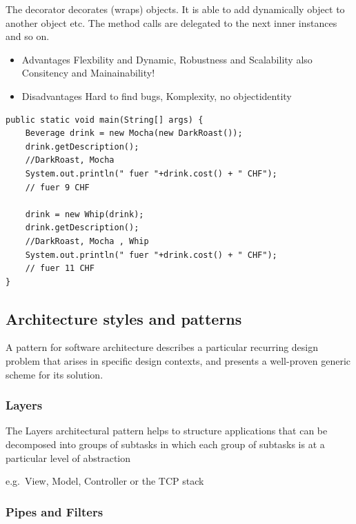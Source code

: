The decorator decorates (wraps) objects. It is able to add dynamically object to another object etc. The method calls are delegated to the next inner instances and so on. 
\begin{itemize}
    \item Advantages
    \subitem Flexbility and Dynamic, Robustness and Scalability also Consitency and Mainainability!
    \item Disadvantages
    \subitem Hard to find bugs, Komplexity, no objectidentity
\end{itemize}

\begin{lstlisting}
public static void main(String[] args) { 
    Beverage drink = new Mocha(new DarkRoast()); 
    drink.getDescription(); 
    //DarkRoast, Mocha 
    System.out.println(" fuer "+drink.cost() + " CHF"); 
    // fuer 9 CHF 
    
    drink = new Whip(drink); 
    drink.getDescription();
    //DarkRoast, Mocha , Whip
    System.out.println(" fuer "+drink.cost() + " CHF"); 
    // fuer 11 CHF 
} 
\end{lstlisting}






\hypertarget{architecture-styles-and-patterns}{%
\subsection{Architecture styles and
patterns}\label{architecture-styles-and-patterns}}

\begin{tcolorbox}[colback=red!5!white,colframe=red!75!black]
A pattern for software architecture describes a particular
recurring design problem that arises in specific design contexts, and
presents a well-proven generic scheme for its solution.
\end{tcolorbox}

\hypertarget{layers}{%
\subsubsection{Layers}\label{layers}}

The Layers architectural pattern helps to structure applications that
can be decomposed into groups of subtasks in which each group of
subtasks is at a particular level of abstraction

e.g.~View, Model, Controller or the TCP stack

\hypertarget{pipes-and-filters}{%
\subsubsection{Pipes and Filters}\label{pipes-and-filters}}


